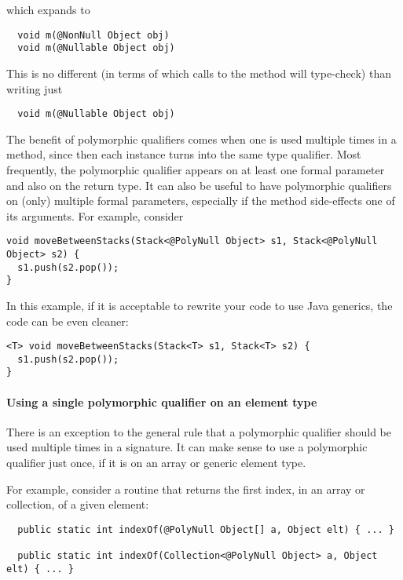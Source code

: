 \noindent
which expands to

\begin{Verbatim}
  void m(@NonNull Object obj)
  void m(@Nullable Object obj)
\end{Verbatim}

This is no different (in terms of which calls to the method will
type-check) than writing just

\begin{Verbatim}
  void m(@Nullable Object obj)
\end{Verbatim}

The benefit of polymorphic qualifiers comes when one is used multiple times
in a method, since then each instance turns into the same type qualifier.
Most frequently, the polymorphic qualifier appears on at least one formal
parameter and also on the return type.  It can also be useful to have 
polymorphic qualifiers on (only) multiple formal parameters, especially if
the method side-effects one of its arguments.
For example, consider

\begin{Verbatim}
void moveBetweenStacks(Stack<@PolyNull Object> s1, Stack<@PolyNull Object> s2) {
  s1.push(s2.pop());
}
\end{Verbatim}

\noindent
In this example, if it is acceptable to rewrite your code to use Java
generics, the code can be even cleaner:

\begin{Verbatim}
<T> void moveBetweenStacks(Stack<T> s1, Stack<T> s2) {
  s1.push(s2.pop());
}
\end{Verbatim}




\paragraph{Using a single polymorphic qualifier on an element type\label{qualifier-polymorphism-element-types}}

There is an exception to the general rule that a polymorphic qualifier
should be used multiple times in a signature.  It can make sense to use a
polymorphic qualifier just once, if it is on an array or generic element
type.

For example, consider a routine that returns the first index, in an array
or collection, of a given element:

\begin{Verbatim}
  public static int indexOf(@PolyNull Object[] a, Object elt) { ... }

  public static int indexOf(Collection<@PolyNull Object> a, Object elt) { ... }
\end{Verbatim}

